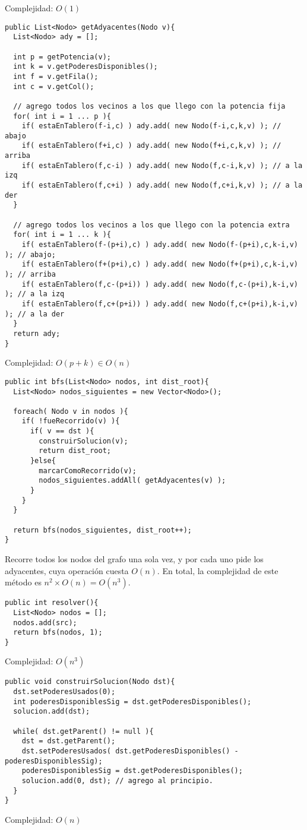 Complejidad: $O(1)$


\footnotesize\begin{verbatim}
public List<Nodo> getAdyacentes(Nodo v){
  List<Nodo> ady = [];

  int p = getPotencia(v);
  int k = v.getPoderesDisponibles();
  int f = v.getFila();
  int c = v.getCol();

  // agrego todos los vecinos a los que llego con la potencia fija
  for( int i = 1 ... p ){
    if( estaEnTablero(f-i,c) ) ady.add( new Nodo(f-i,c,k,v) ); // abajo
    if( estaEnTablero(f+i,c) ) ady.add( new Nodo(f+i,c,k,v) ); // arriba
    if( estaEnTablero(f,c-i) ) ady.add( new Nodo(f,c-i,k,v) ); // a la izq
    if( estaEnTablero(f,c+i) ) ady.add( new Nodo(f,c+i,k,v) ); // a la der
  }

  // agrego todos los vecinos a los que llego con la potencia extra
  for( int i = 1 ... k ){
    if( estaEnTablero(f-(p+i),c) ) ady.add( new Nodo(f-(p+i),c,k-i,v) ); // abajo;
    if( estaEnTablero(f+(p+i),c) ) ady.add( new Nodo(f+(p+i),c,k-i,v) ); // arriba
    if( estaEnTablero(f,c-(p+i)) ) ady.add( new Nodo(f,c-(p+i),k-i,v) ); // a la izq
    if( estaEnTablero(f,c+(p+i)) ) ady.add( new Nodo(f,c+(p+i),k-i,v) ); // a la der
  }
  return ady;
}
\end{verbatim}\normalsize

Complejidad: $O(p+k) \in O(n)$

\footnotesize\begin{verbatim}
public int bfs(List<Nodo> nodos, int dist_root){
  List<Nodo> nodos_siguientes = new Vector<Nodo>();

  foreach( Nodo v in nodos ){
    if( !fueRecorrido(v) ){
      if( v == dst ){
        construirSolucion(v);
        return dist_root;
      }else{
        marcarComoRecorrido(v);
        nodos_siguientes.addAll( getAdyacentes(v) );
      }
    }
  }

  return bfs(nodos_siguientes, dist_root++);
}
\end{verbatim}\normalsize

Recorre todos los nodos del grafo una sola vez, y por cada uno pide los adyacentes, cuya operaci\'on cuesta $O(n)$. En total, la complejidad de este m\'etodo es $n^2 \times O(n) = O(n^3)$.  

\footnotesize\begin{verbatim}
public int resolver(){
  List<Nodo> nodos = [];
  nodos.add(src);
  return bfs(nodos, 1);
}
\end{verbatim}\normalsize

Complejidad: $O(n^3)$

\footnotesize\begin{verbatim}
public void construirSolucion(Nodo dst){
  dst.setPoderesUsados(0);
  int poderesDisponiblesSig = dst.getPoderesDisponibles();
  solucion.add(dst);

  while( dst.getParent() != null ){
    dst = dst.getParent();
    dst.setPoderesUsados( dst.getPoderesDisponibles() - poderesDisponiblesSig);
    poderesDisponiblesSig = dst.getPoderesDisponibles();
    solucion.add(0, dst); // agrego al principio. 
  }
}
\end{verbatim}\normalsize

Complejidad: $O(n)$